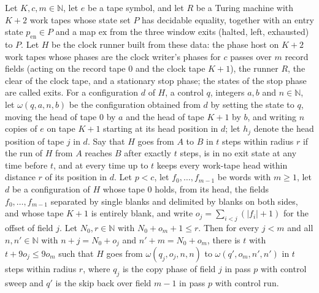 \begin{lemma}
\label{Turing.cw_pass}
\leanok
{}
Let $K,c,m\in\mathbb{N}$, let $e$ be a tape symbol, and let $R$ be a Turing machine with $K+2$
work tapes whose state set $P$ has decidable equality, together with an entry state
$p_{\mathrm{en}}\in P$ and a map $\mathrm{ex}$ from the three window exits (halted, left,
exhausted) to $P$. Let $H$ be the clock runner built from these data: the phase host on $K+2$
work tapes whose phases are the clock writer's phases for $c$ passes over $m$ record fields
(acting on the record tape $0$ and the clock tape $K+1$), the runner $R$, the clear of the
clock tape, and a stationary stop phase; the states of the stop phase are called exits. For a
configuration $d$ of $H$, a control $q$, integers $a,b$ and $n\in\mathbb{N}$, let
$\omega(q,a,n,b)$ be the configuration obtained from $d$ by setting the state to $q$, moving
the head of tape $0$ by $a$ and the head of tape $K+1$ by $b$, and writing $n$ copies of $e$ on
tape $K+1$ starting at its head position in $d$; let $h_j$ denote the head position of tape $j$
in $d$. Say that $H$ goes from $A$ to $B$ in $t$ steps within radius $r$ if the run of $H$ from
$A$ reaches $B$ after exactly $t$ steps, is in no exit state at any time before $t$, and at
every time up to $t$ keeps every work-tape head within distance $r$ of its position in $d$. Let
$p<c$, let $f_0,\dots,f_{m-1}$ be words with $m\ge 1$, let $d$ be a configuration of $H$ whose
tape $0$ holds, from its head, the fields $f_0,\dots,f_{m-1}$ separated by single blanks and
delimited by blanks on both sides, and whose tape $K+1$ is entirely blank, and write
$o_j=\sum_{i<j}(|f_i|+1)$ for the offset of field $j$. Let $N_0,r\in\mathbb{N}$ with
$N_0+o_m+1\le r$. Then for every $j<m$ and all $n,n'\in\mathbb{N}$ with $n+j=N_0+o_j$ and
$n'+m=N_0+o_m$, there is $t$ with $t+9o_j\le 9o_m$ such that $H$ goes from
$\omega(q_j,o_j,n,n)$ to $\omega(q',o_m,n',n')$ in $t$ steps within radius $r$, where $q_j$ is
the copy phase of field $j$ in pass $p$ with control sweep and $q'$ is the skip back over field
$m-1$ in pass $p$ with control run.
\end{lemma}

